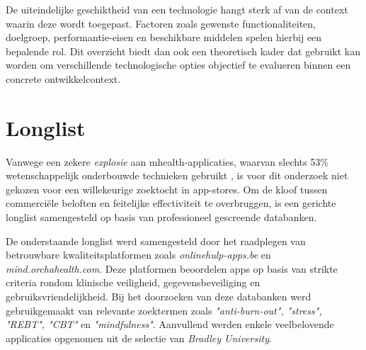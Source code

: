 \vspace{1em}

De uiteindelijke geschiktheid van een technologie hangt sterk af van de context waarin deze wordt toegepast. Factoren zoals gewenste functionaliteiten, doelgroep, performantie-eisen en beschikbare middelen spelen hierbij een bepalende rol. Dit overzicht biedt dan ook een theoretisch kader dat gebruikt kan worden om verschillende technologische opties objectief te evalueren binnen een concrete ontwikkelcontext.

\vspace{1em}


\section{Longlist}
\label{sec:longlist}

\vspace{1em}

Vanwege een zekere \textit{explosie} aan \acrshort{mhealth}-applicaties, waarvan slechts 53\% wetenschappelijk onderbouwde technieken gebruikt \autocite{Larsen2019}, is voor dit onderzoek niet gekozen voor een willekeurige zoektocht in app-stores. Om de kloof tussen commerciële beloften en feitelijke effectiviteit te overbruggen, is een gerichte longlist samengesteld op basis van professioneel gescreende databanken. 

\vspace{1em}

De onderstaande longlist werd samengesteld door het raadplegen van betrouwbare kwaliteitsplatformen zoals \textit{onlinehulp-apps.be} en \textit{mind.orchahealth.com}. Deze platformen beoordelen apps op basis van strikte criteria rondom klinische veiligheid, gegevensbeveiliging en gebruiksvriendelijkheid. Bij het doorzoeken van deze databanken werd gebruikgemaakt van relevante zoektermen zoals \textit{"anti-burn-out", "stress", "REBT", "CBT"} en \textit{"mindfulness"}. Aanvullend werden enkele veelbelovende applicaties opgenomen uit de selectie van \textit{Bradley University}.

\vspace{1em}

